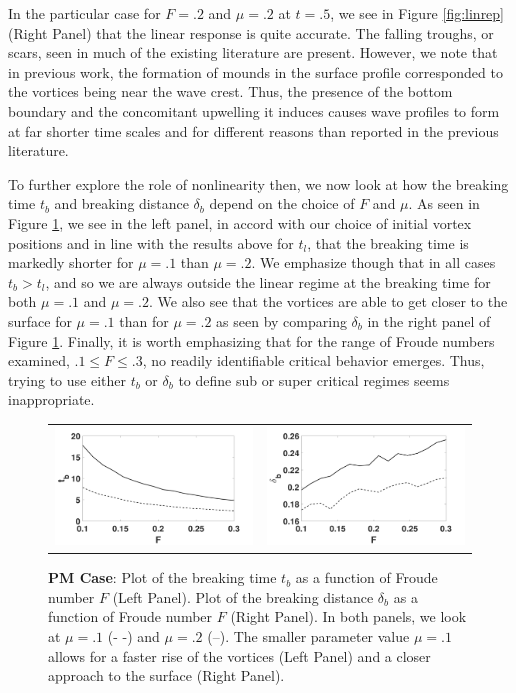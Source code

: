 \documentclass[a4paper,11pt]{article}
\begin{document}
In the particular case for $F=.2$ and $\mu=.2$ at $t=.5$, we see in Figure \ref{fig:linrep} (Right Panel) that the linear response is quite accurate.  The falling troughs, or scars, seen in much of the existing literature \cite{marcus,tryggvason} are present.  However, we note that in previous work, the formation of mounds in the surface profile corresponded to the vortices being near the wave crest.  Thus, the presence of the bottom boundary and the concomitant upwelling it induces causes wave profiles to form at far shorter time scales and for different reasons than reported in the previous literature.  

To further explore the role of nonlinearity then, we now look at how the breaking time $t_{b}$ and breaking distance $\delta_{b}$ depend on the choice of $F$ and $\mu$.  As seen in Figure \ref{fig:froudecomp}, we see in the left panel, in accord with our choice of initial vortex positions and in line with the results above for $t_{l}$, that the breaking time is markedly shorter for $\mu=.1$ than $\mu=.2$.   We emphasize though that in all cases $t_{b}>t_{l}$, and so we are always outside the linear regime at the breaking time for both $\mu=.1$ and $\mu=.2$.  We also see that the vortices are able to get closer to the surface for $\mu=.1$ than for $\mu=.2$ as seen by comparing $\delta_{b}$ in the right panel of Figure \ref{fig:froudecomp}.  Finally, it is worth emphasizing that for the range of Froude numbers examined, $.1\leq F \leq .3$, no readily identifiable critical behavior emerges.  Thus, trying to use either $t_{b}$ or $\delta_{b}$ to define sub or super critical regimes seems inappropriate.  
%
\begin{figure}[!h]
\centering
\begin{tabular}{cc}
\includegraphics[width=.5\textwidth]{froude_comp_pm} & 
\includegraphics[width=.5\textwidth]{zmb_pm}
\end{tabular}
\caption{\small {\bf PM Case}: Plot of the breaking time $t_{b}$ as a function of Froude number $F$ (Left Panel). Plot of the breaking distance $\delta_{b}$ as a function of Froude number $F$ (Right Panel).  In both panels, we look at $\mu=.1$ (- -) and $\mu=.2$ (--). The smaller parameter value $\mu=.1$ allows for a faster rise of the vortices (Left Panel) and a closer approach to the surface (Right Panel).}
\label{fig:froudecomp}
\end{figure}
\end{document}
